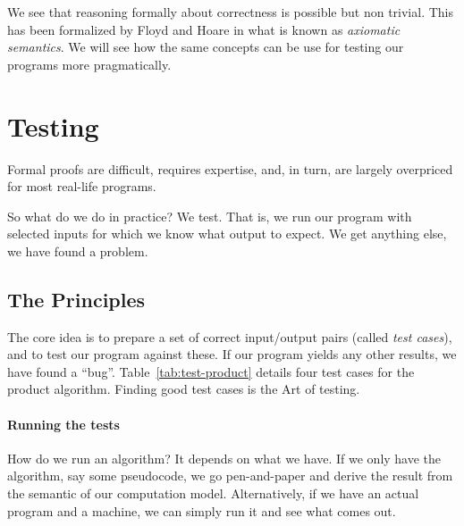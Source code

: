 \documentclass{aldast}
\begin{document}
We see that reasoning formally about correctness is possible but non
trivial. This has been formalized by Floyd and Hoare in what is known
as \emph{axiomatic semantics}. We will see how the
same concepts can be use for testing our programs more pragmatically.

\section{Testing}
Formal proofs are difficult, requires expertise, and, in turn, are
largely overpriced for most real-life programs. 

So what do we do in practice? We test. That is, we run our program
with selected inputs for which we know what output to expect. We get
anything else, we have found a problem.

\subsection{The Principles}
 The core idea is to prepare a set of correct input/output pairs
(called \emph{test cases}), and to test our program against these. If
our program yields any other results, we have found a
``bug''. Table~\ref{tab:test-product} details four test cases for the
product algorithm. Finding good test cases is the Art of testing.

\paragraph{Running the tests} How do we run an algorithm? It depends
on what we have. If we only have the algorithm, say some pseudocode,
we go pen-and-paper and derive the result from the semantic of our
computation model. Alternatively, if we have an actual program and a
machine, we can simply run it and see what comes out.
\end{document}
